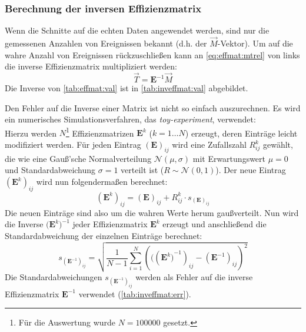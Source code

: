 \subsubsection{Berechnung der inversen Effizienzmatrix}
Wenn die Schnitte auf die echten Daten angewendet werden, sind nur die gemessenen Anzahlen von Ereignissen bekannt 
(d.h. der $\vec{M}$-Vektor). Um auf die wahre Anzahl von Ereignissen rückzuschließen kann an \autoref{eq:effmat:mtrel} 
von links die inverse Effizienzmatrix multipliziert werden:
\begin{equation}
    \vec{T} = \bm{E}^{-1} \vec{M}
\end{equation}
Die Inverse von \autoref{tab:effmat:val} ist in \autoref{tab:inveffmat:val} abgebildet.

Den Fehler auf die Inverse einer Matrix ist nicht so einfach auszurechnen. Es wird ein numerisches Simulationsverfahren, 
das \emph{toy-experiment}, verwendet: \\
Hierzu werden $N$\footnote{Für die Auswertung wurde $N=100000$ gesetzt.} Effizienzmatrizen $\bm{E}^k$ ($k=1 \ldots N$) erzeugt, 
deren Einträge leicht modifiziert werden. Für jeden Eintrag $(\bm{E})_{ij}$ wird eine Zufallszahl $R_{ij}^k$ 
gewählt, die wie eine Gauß'sche Normalverteilung $\mathcal{N}(\mu, \sigma)$ mit Erwartungswert $\mu = 0$ und 
Standardabweichung $\sigma = 1$ verteilt ist ($R \sim \mathcal{N}(0, 1)$). Der neue Eintrag $(\bm{E}^k)_{ij}$ wird nun folgendermaßen berechnet:
\begin{equation}
    (\bm{E}^k)_{ij} = (\bm{E})_{ij} + R_{ij}^k \cdot s_{(\bm{E})_{ij}}
\end{equation}
Die neuen Einträge sind also um die wahren Werte herum gaußverteilt. Nun wird die Inverse ${(\bm{E}^k})^{-1}$ jeder 
Effizienzmatrix $\bm{E}^k$ erzeugt und 
anschließend die Standardabweichung der einzelnen Einträge berechnet:
\begin{equation}
    s_{(\bm{E}^{-1})_{ij}} = \sqrt{\frac{1}{N-1} \sum_{i=1}^{N} \left((({\bm{E}^k)}^{-1})_{ij} - (\bm{E}^{-1})_{ij} \right)^2 }
\end{equation}
Die Standardabweichungen $s_{(\bm{E}^{-1})_{ij}}$ werden als Fehler auf die inverse Effizienzmatrix $\bm{E}^{-1}$ verwendet 
(\autoref{tab:inveffmat:err}).

